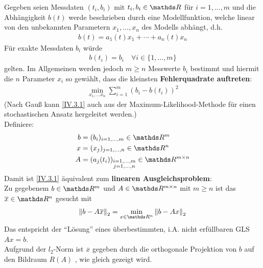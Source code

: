  
Gegeben seien Messdaten $(t_i, b_i)$ mit $t_i, b_i\in \R$ für $i=1, \dotsc, m$ 
und die Abhängigkeit $b(t)$ werde beschrieben durch eine Modellfunktion,
welche linear von den unbekannten Parametern $x_1, \dotsc, x_n$ des Modells abhängt,
d.h.
\begin{gather*}
  b(t) = a_1(t)x_1 + \dotsb+ a_n(t) x_n
\end{gather*}
Für exakte Messdaten $b_i$ würde 
\begin{gather*}
  b(t_i) = b_i \quad \forall i\in\{1,\dotsc , m\}
\end{gather*}
gelten.
Im Allgemeinen werden jedoch $m\geq n $ Messwerte $b_i$ bestimmt
und hiermit die $n$ Parameter $x_i$ so gewählt, dass die kleinsten
\textbf{Fehlerquadrate auftreten}:
\begin{gather}
  \min_{x_1, \dotsc x_n} \sum_{i=1}^{m} (b_i-b(t_i))^2 \label{IV.3.1}
\end{gather}
(Nach Gauß kann \eqref{IV.3.1} auch aus der Maximum-Likelihood-Methode
für einen stochastischen Ansatz hergeleitet werden.)\\

Definiere:
\begin{align*}
  b &= (b_i)_{i=1,\dotsc, m}\in \R^m \\
  x &= (x_j)_{j=1,\dotsc, n}\in \R^n \\
  A &= (a_j(t_i)) _{\substack{i=1,\dotsc, m \\ 
  j= 1, \dotsc, n}} \in \R^{m\times n}
\end{align*}
Damit ist \eqref{IV.3.1} äquivalent zum \textbf{linearen Ausgleichsproblem}:\\
Zu gegebenem $b\in\R^m$ und $A\in\R^{m\times n}$ mit $m\geq n$
ist das $\overline{x} \in \R^n$ gesucht mit 
\begin{gather}
  \nn[b-A\overline{x}]_2 = \min_{x\in\R^n} \nn[b-Ax]_2
  \label{IV.3.2}
\end{gather}
Das entspricht der \enquote{Lösung} eines überbestimmten, i.A. nicht erfüllbaren
GLS $Ax=b$.\\
Aufgrund der $l_2$-Norm ist $\overline{x}$ gegeben durch die 
orthogonale Projektion von $b$ auf den Bildraum $R(A) $ , wie gleich gezeigt wird. \\

